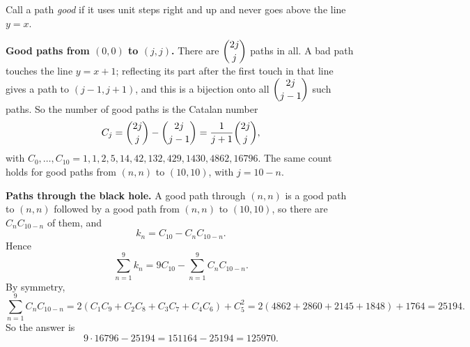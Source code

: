 Call a path \emph{good} if it uses unit steps right and up and never goes above the line $y=x$.

\textbf{Good paths from $(0,0)$ to $(j,j)$.} There are $\dbinom{2j}{j}$ paths in all. A bad path touches the line $y=x+1$; reflecting its part after the first touch in that line gives a path to $(j-1,j+1)$, and this is a bijection onto all $\dbinom{2j}{j-1}$ such paths. So the number of good paths is the Catalan number
\[C_j=\dbinom{2j}j-\dbinom{2j}{j-1}=\dfrac{1}{j+1}\dbinom{2j}{j},\]
with $C_0,\dots,C_{10}=1,1,2,5,14,42,132,429,1430,4862,16796$. The same count holds for good paths from $(n,n)$ to $(10,10)$, with $j=10-n$.

\textbf{Paths through the black hole.} A good path through $(n,n)$ is a good path to $(n,n)$ followed by a good path from $(n,n)$ to $(10,10)$, so there are $C_nC_{10-n}$ of them, and
\[k_n=C_{10}-C_nC_{10-n}.\]
Hence
\[\sum_{n=1}^9k_n=9C_{10}-\sum_{n=1}^{9}C_nC_{10-n}.\]
By symmetry,
\[\sum_{n=1}^{9}C_nC_{10-n}=2\left(C_1C_9+C_2C_8+C_3C_7+C_4C_6\right)+C_5^2=2(4862+2860+2145+1848)+1764=25194.\]
So the answer is
\[9\cdot16796-25194=151164-25194=\boxed{125970}.\]
